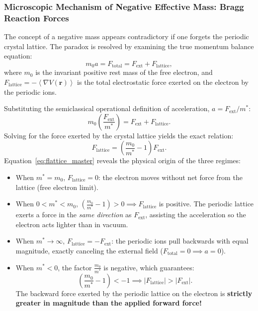 \documentclass[11pt,a4paper]{article}
\newcommand{\expect}[1]{\left\langle #1 \right\rangle}
\newcommand{\abs}[1]{\left|#1\right|}
\newcommand{\rvec}{\mathbf{r}}
\begin{document}
\subsubsection{Microscopic Mechanism of Negative Effective Mass: Bragg Reaction Forces}
The concept of a negative mass appears contradictory if one forgets the periodic crystal lattice. The paradox is resolved by examining the true momentum balance equation:
\begin{equation}
    m_0 a = F_{\mathrm{total}} = F_{\mathrm{ext}} + F_{\mathrm{lattice}},
\end{equation}
where $m_0$ is the invariant positive rest mass of the free electron, and $F_{\mathrm{lattice}} = -\expect{\nabla V(\rvec)}$ is the total electrostatic force exerted on the electron by the periodic ions.

Substituting the semiclassical operational definition of acceleration, $a = F_{\mathrm{ext}}/m^*$:
\begin{equation}
    m_0\left(\frac{F_{\mathrm{ext}}}{m^*}\right) = F_{\mathrm{ext}} + F_{\mathrm{lattice}}.
\end{equation}
Solving for the force exerted by the crystal lattice yields the exact relation:
\begin{equation}
    \boxed{F_{\mathrm{lattice}} = \left(\frac{m_0}{m^*} - 1\right)F_{\mathrm{ext}}.}
    \label{eq:flattice_master}
\end{equation}
Equation~\eqref{eq:flattice_master} reveals the physical origin of the three regimes:
\begin{itemize}
    \item When $m^* = m_0$, $F_{\mathrm{lattice}} = 0$: the electron moves without net force from the lattice (free electron limit).
    \item When $0 < m^* < m_0$, $\left(\frac{m_0}{m^*} - 1\right) > 0 \implies F_{\mathrm{lattice}}$ is positive. The periodic lattice exerts a force in the \emph{same direction} as $F_{\mathrm{ext}}$, assisting the acceleration so the electron acts lighter than in vacuum.
    \item When $m^* \to \infty$, $F_{\mathrm{lattice}} = -F_{\mathrm{ext}}$: the periodic ions pull backwards with equal magnitude, exactly canceling the external field ($F_{\mathrm{total}} = 0 \implies a = 0$).
    \item When $m^* < 0$, the factor $\frac{m_0}{m^*}$ is negative, which guarantees:
    \begin{equation}
        \left(\frac{m_0}{m^*} - 1\right) < -1 \implies \abs{F_{\mathrm{lattice}}} > \abs{F_{\mathrm{ext}}}.
    \end{equation}
    The backward force exerted by the periodic lattice on the electron is \textbf{strictly greater in magnitude than the applied forward force!}
\end{itemize}
\end{document}

